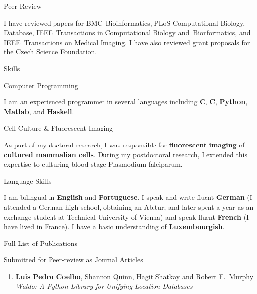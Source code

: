 \documentclass{article}
\renewcommand\section[1]{%
    \par\vspace{2em}\penalty-100%
    {\subhead #1}%
    \par\penalty100\vspace{1em}\penalty100%
}
\renewcommand\subsection[1]{%
    \par\vspace{.1em}%
    {\hspace{1em}\subsubhead #1}%
    \par\vspace{.2em}%
}
\newcommand\cvitem[2][\relax]{%
    \par\vspace{.8em}
    \if\relax#1\else{\Date \textcolor{medg}{#1}}\hspace{1em}\fi%
    {\CvItem #2}%
    \par\vspace{.4em}
}
\begin{document}
\cvitem{Peer Review}
I have reviewed papers for BMC~Bioinformatics, PLoS Computational Biology,
Database, IEEE~Transactions in Computational Biology and~Bionformatics, and
IEEE~Transactions on Medical Imaging. I have also reviewed grant proposals for
the Czech Science Foundation.

\section{Skills}

\cvitem{Computer Programming}
I am an experienced programmer in several languages including \textbf{C},
\textbf{C\raisebox{.2em}{\tiny \bf ++}}, \textbf{Python}, \textbf{Matlab}, and
\textbf{Haskell}.

\cvitem{Cell Culture \& Fluorescent Imaging}
As part of my doctoral research, I was responsible for \textbf{fluorescent
imaging} of \textbf{cultured mammalian cells}. During my postdoctoral research,
I extended this expertise to culturing blood-stage Plasmodium falciparum.

\cvitem{Language Skills}
I am bilingual in \textbf{English} and \textbf{Portuguese}. I speak and write
fluent \textbf{German} (I attended a German high-school, obtaining an Abitur;
and later spent a year as an exchange student at Technical University of
Vienna) and speak fluent \textbf{French} (I have lived in France). I have a
basic understanding of \textbf{Luxembourgish}.

\pagebreak
\section{Full List of Publications}

\subsection{Submitted for Peer-review as Journal Articles}
\begin{enumerate}
\item \textbf{Luis Pedro Coelho}, Shannon Quinn, Hagit Shatkay and Robert
F.~Murphy \emph{Waldo: A Python Library for Unifying Location Databases}
\end{enumerate}
\end{document}
